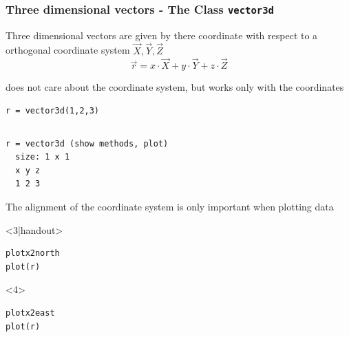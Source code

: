 \begin{frame}[fragile]
  \frametitle{Three dimensional vectors - The \MTEX Class \texttt{\bf vector3d}}

  Three dimensional vectors are given by there coordinate with respect to a
  orthogonal coordinate system $\vec X, \vec Y, \vec Z$
  \begin{equation*}
    \vec r = x \cdot \vec X + y \cdot \vec Y + z \cdot \vec Z
  \end{equation*}

  \pause

  \MTEX does not care about the coordinate system, but works only with the
  coordinates

  \begin{lstlisting}
r = vector3d(1,2,3)
  \end{lstlisting}

  \begin{columns}
    \begin{column}{8cm}
\begin{lstlisting}[style=output]
r = vector3d (show methods, plot)
  size: 1 x 1
  x y z
  1 2 3
\end{lstlisting}

      \pause
      \medskip

      The alignment of the coordinate system is only important when plotting
      data
      \begin{onlyenv}<3|handout>
\begin{lstlisting}
plotx2north
plot(r)
\end{lstlisting}
      \end{onlyenv}
      \begin{onlyenv}<4>
\begin{lstlisting}
plotx2east
plot(r)
\end{lstlisting}
      \end{onlyenv}

    \end{column}
    \begin{column}{3.5cm}
    \end{column}
  \end{columns}

\end{frame}

